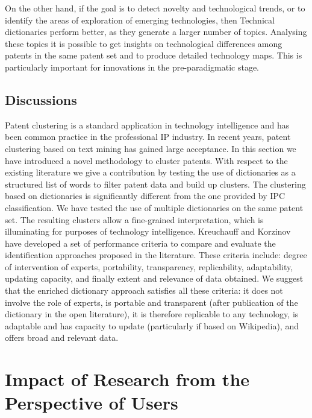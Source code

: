 \documentclass[b5paper,]{book}
\theoremstyle{definition}
\theoremstyle{definition}
\theoremstyle{definition}
\theoremstyle{remark}
\begin{document}
On the other hand, if the goal is to detect novelty and technological
trends, or to identify the areas of exploration of emerging
technologies, then Technical dictionaries perform better, as they
generate a larger number of topics. Analysing these topics it is
possible to get insights on technological differences among patents in
the same patent set and to produce detailed technology maps. This is
particularly important for innovations in the pre-paradigmatic stage.

\section{Discussions}\label{discussions}

Patent clustering is a standard application in technology intelligence
and has been common practice in the professional IP industry. In recent
years, patent clustering based on text mining has gained large
acceptance. In this section we have introduced a novel methodology to
cluster patents. With respect to the existing literature we give a
contribution by testing the use of dictionaries as a structured list of
words to filter patent data and build up clusters. The clustering based
on dictionaries is significantly different from the one provided by IPC
classification. We have tested the use of multiple dictionaries on the
same patent set. The resulting clusters allow a fine-grained
interpretation, which is illuminating for purposes of technology
intelligence. Kreuchauff and Korzinov \citep{kreuchauff2017patent} have
developed a set of performance criteria to compare and evaluate the
identification approaches proposed in the literature. These criteria
include: degree of intervention of experts, portability, transparency,
replicability, adaptability, updating capacity, and finally extent and
relevance of data obtained. We suggest that the enriched dictionary
approach satisfies all these criteria: it does not involve the role of
experts, is portable and transparent (after publication of the
dictionary in the open literature), it is therefore replicable to any
technology, is adaptable and has capacity to update (particularly if
based on Wikipedia), and offers broad and relevant data.

\chapter{Impact of Research from the Perspective of
Users}\label{impactresuser}
\end{document}
